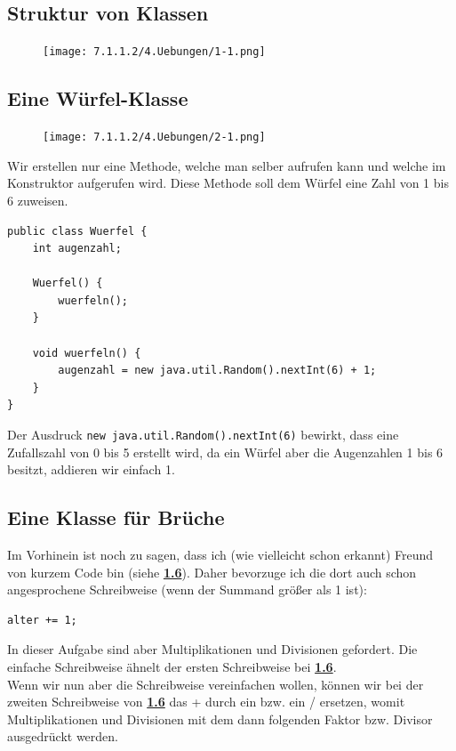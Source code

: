 \documentclass{scrartcl}   %
\begin{document}
\subsection{Struktur von Klassen}

\begin{figure}[ht]
	\centering
	\texttt{[image: 7.1.1.2/4.Uebungen/1-1.png]}
\end{figure}

\subsection{Eine Würfel-Klasse}

\begin{figure}[ht]
	\centering
	\texttt{[image: 7.1.1.2/4.Uebungen/2-1.png]}
\end{figure}

Wir erstellen nur eine Methode, welche man selber aufrufen kann und welche im Konstruktor aufgerufen wird. Diese Methode soll dem Würfel eine Zahl von 1 bis 6 zuweisen.

\newpage

\begin{lstlisting}
public class Wuerfel {
    int augenzahl;
    
    Wuerfel() {
        wuerfeln();
    }
    
    void wuerfeln() {
        augenzahl = new java.util.Random().nextInt(6) + 1;
    }
}
\end{lstlisting}

Der Ausdruck \texttt{new  java.util.Random().nextInt(6)} bewirkt, dass eine Zufallszahl von 0 bis 5 erstellt wird, da ein Würfel aber die Augenzahlen 1 bis 6 besitzt, addieren wir einfach 1.

\subsection{Eine Klasse für Brüche}

Im Vorhinein ist noch zu sagen, dass ich (wie vielleicht schon erkannt) Freund von kurzem Code bin (siehe \hyperlink{subsection.1.6}{\textbf{1.6}}). Daher bevorzuge ich die dort auch schon angesprochene Schreibweise (wenn der Summand größer als 1 ist):\\
\begin{lstlisting}
alter += 1;
\end{lstlisting}

In dieser Aufgabe sind aber Multiplikationen und Divisionen gefordert. Die einfache Schreibweise ähnelt der ersten Schreibweise bei \hyperlink{subsection.1.6}{\textbf{1.6}}.\\
Wenn wir nun aber die Schreibweise vereinfachen wollen, können wir bei der zweiten Schreibweise von \hyperlink{subsection.1.6}{\textbf{1.6}} das \glqq +\grqq{} durch ein \glqq *\grqq{} bzw. ein \glqq/\grqq{} ersetzen, womit Multiplikationen und Divisionen mit dem dann folgenden Faktor bzw. Divisor ausgedrückt werden.\\
\end{document}
